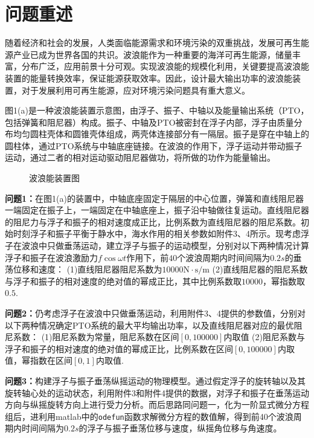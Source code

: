 \documentclass{article}
\numberwithin{equation}{subsection}
\begin{document}
\newpage





{\centering\section{问题重述}}
随着经济和社会的发展，人类面临能源需求和环境污染的双重挑战，发展可再生能源产业已成为世界各国的共识。波浪能作为一种重要的海洋可再生能源，储量丰富，分布广泛，应用前景十分可观。实现波浪能的规模化利用，关键要提高波浪能装置的能量转换效率，保证能源获取效率。因此，设计最大输出功率的波浪能装置，对于发展利用可再生能源，应对环境污染问题具有重大意义。

图1(a)是一种波浪能装置示意图，由浮子、振子、中轴以及能量输出系统（PTO，包括弹簧和阻尼器）构成。振子、中轴及PTO被密封在浮子内部，浮子由质量分布均匀圆柱壳体和圆锥壳体组成，两壳体连接部分有一隔层。振子是穿在中轴上的圆柱体，通过PTO系统与中轴底座链接。在波浪的作用下，浮子运动并带动振子运动，通过二者的相对运动驱动阻尼器做功，将所做的功作为能量输出。

\begin{figure}[htbp]
    \centering
    \quad
    \caption{波浪能装置图}
\end{figure}


\textbf{问题1：}在图1(a)的装置中，中轴底座固定于隔层的中心位置，弹簧和直线阻尼器一端固定在振子上，一端固定在中轴底座上，振子沿中轴做往复运动。直线阻尼器的阻尼力与浮子和振子的相对速度成正比，比例系数为直线阻尼器的阻尼系数。初始时刻浮子和振子平衡于静水中，海水作用的相关参数如附件3、4所示。现考虑浮子在波浪中只做垂荡运动，建立浮子与振子的运动模型，分别对以下两种情况计算浮子和振子在波浪激励力$f \cos \omega t$作用下，前$40$个波浪周期内时间间隔为$0.2s$的垂荡位移和速度：
(1)直线阻尼器阻尼系数为$10000\mathrm{N} \cdot \mathrm{s} / \mathrm{m}$
(2)直线阻尼器的阻尼系数与浮子和振子的相对速度的绝对值的幂成正比，其中比例系数取$10000$，幂指数取$0.5$.
    
\textbf{问题2：}仍考虑浮子在波浪中只做垂荡运动，利用附件3、4提供的参数值，分别对以下两种情况确定PTO系统的最大平均输出功率，以及直线阻尼器对应的最优阻尼系数：
(1)阻尼系数为常量，阻尼系数在区间$[0,100000]$内取值
(2)阻尼系数与浮子和振子的相对速度的绝对值的幂成正比，比例系数在区间$[0,100000]$内取值，幂指数在区间$[0,1]$内取值.

\textbf{问题3：}构建浮子与振子垂荡纵摇运动的物理模型。通过假定浮子的旋转轴以及其旋转轴心处的运动状态，利用附件3和附件4提供的数据，对浮子和振子在垂荡运动方向与纵摇旋转方向上进行受力分析。而后思路同问题一，化为一阶显式微分方程组后，进利用matlab中的\verb|odefun|函数求解微分方程的数值解，得到前40个波浪周期内时间间隔为$0.2s$的浮子与振子垂荡位移与速度，纵摇角位移与角速度。
\end{document}
